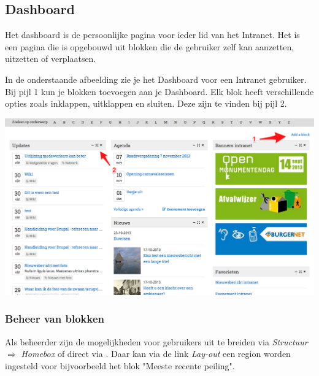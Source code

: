 \subsection{Dashboard}\label{dashboard}
Het dashboard is de persoonlijke pagina voor ieder lid van het Intranet. Het is een pagina die is opgebouwd uit blokken die de gebruiker zelf kan aanzetten, uitzetten of verplaatsen.

In de onderstaande afbeelding zie je het Dashboard voor een Intranet gebruiker. 
Bij pijl 1 kun je blokken toevoegen aan je Dashboard. Elk blok heeft verschillende opties zoals inklappen, uitklappen en sluiten. Deze zijn te vinden bij pijl 2.

\begin{center}
	\includegraphics[width=\textwidth]{img/dashboard.png}
\end{center}

\subsubsection{Beheer van blokken}

Als beheerder zijn de mogelijkheden voor gebruikers uit te breiden via \emph{Structuur} $\Rightarrow$ \emph{Homebox} of direct via . Daar kan via de link \emph{Lay-out}  een region worden ingesteld voor  bijvoorbeeld het blok "Meeste recente peiling".

